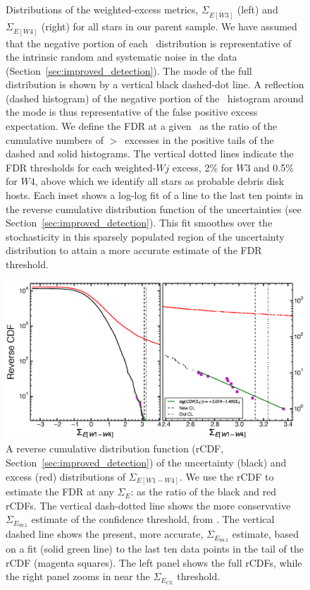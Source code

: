 \begin{figure}
\caption[Weighted Excess $\Sigma_{\overline{E}}$ Distributions]{Distributions of the weighted-excess metrics, $\Sigma_{\overline{E[W3]}}$ (left) and $\Sigma_{\overline{E[W4]}}$ (right) for all stars in our parent sample. We have assumed that the negative portion of each \ES\ distribution is representative of the intrinsic random and systematic noise in the data (Section~\ref{sec:improved_detection}). The mode of the full distribution is shown by a vertical black dashed-dot line. A reflection (dashed histogram) of the negative portion of the \ES\ histogram around the mode is thus representative of the false positive excess expectation. We define the FDR at a given \ES\ as the ratio of the cumulative numbers of $>$\ES\ excesses in the positive tails of the dashed and solid histograms.  The vertical dotted lines indicate the FDR thresholds for each weighted-$Wj$ excess, 2\% for $W3$ and 0.5\% for $W4$, above which we identify all stars as probable debris disk hosts. Each inset shows a log-log fit of a line to the last ten points in the reverse cumulative distribution function of the uncertainties (see Section~\ref{sec:improved_detection}). This fit smoothes over the stochasticity in this sparsely populated region of the uncertainty distribution to attain a more accurate estimate of the FDR threshold.}
\label{fig:ColorDist}
\end{figure}



\begin{figure}
\centering
\includegraphics[scale=0.4]{Ch4/CL_Comparison}
\caption[Improved Assessment of False Discovery Rate]{A reverse cumulative distribution function (rCDF, Section~\ref{sec:improved_detection}) of the uncertainty (black) and excess (red) distributions of $\Sigma_{E[W1-W4]}$. We use the rCDF to estimate the FDR at any $\Sigma_E$: as the ratio of the black and red rCDFs. The vertical dash-dotted line shows the more conservative $\Sigma_{E_{99.5}}$ estimate of the confidence threshold, from .  The vertical dashed line shows the present, more accurate, $\Sigma_{E_{99.5}}$ estimate, based on a fit (solid green line) to the last ten data points in the tail of the rCDF (magenta squares). The left panel shows the full rCDFs, while the right panel zooms in near the $\Sigma_{E_{CL}}$ threshold.} 
\label{fig:CL_Comparison}
\end{figure}



